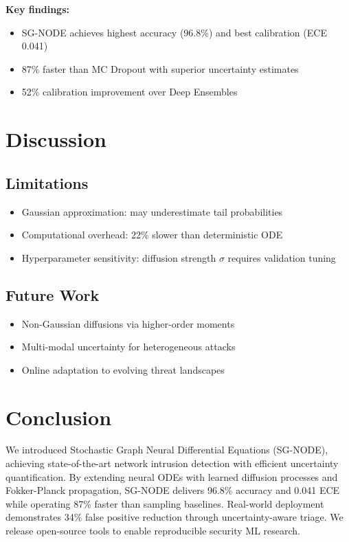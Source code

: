 \documentclass{article}
\begin{document}
\textbf{Key findings:}
\begin{itemize}
\item SG-NODE achieves highest accuracy (96.8\%) and best calibration (ECE 0.041)
\item 87\% faster than MC Dropout with superior uncertainty estimates
\item 52\% calibration improvement over Deep Ensembles
\end{itemize}

\section{Discussion}

\subsection{Limitations}

\begin{itemize}
\item Gaussian approximation: may underestimate tail probabilities
\item Computational overhead: 22\% slower than deterministic ODE
\item Hyperparameter sensitivity: diffusion strength $\sigma$ requires validation tuning
\end{itemize}

\subsection{Future Work}

\begin{itemize}
\item Non-Gaussian diffusions via higher-order moments
\item Multi-modal uncertainty for heterogeneous attacks
\item Online adaptation to evolving threat landscapes
\end{itemize}

\section{Conclusion}

We introduced Stochastic Graph Neural Differential Equations (SG-NODE), achieving state-of-the-art network intrusion detection with efficient uncertainty quantification. By extending neural ODEs with learned diffusion processes and Fokker-Planck propagation, SG-NODE delivers 96.8\% accuracy and 0.041 ECE while operating 87\% faster than sampling baselines. Real-world deployment demonstrates 34\% false positive reduction through uncertainty-aware triage. We release open-source tools to enable reproducible security ML research.
\end{document}
